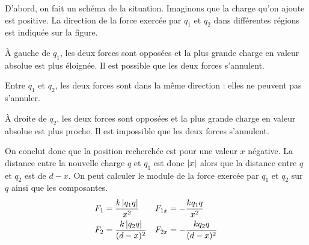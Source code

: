 \begin{reponsebox}
D'abord, on fait un schéma de la situation. Imaginons que la charge qu'on
ajoute est positive. La direction de la force exercée par $q_1$ et $q_2$ dans
différentes régions est indiquée sur la figure.

\begin{center}
\end{center}

À gauche de $q_1$, les deux forces sont opposées et la plus grande charge en
valeur absolue est plus éloignée. Il est possible que les deux forces
s'annulent.

Entre $q_1$ et $q_2$, les deux forces sont dans la même direction : elles ne
peuvent pas s'annuler.

À droite de $q_2$, les deux forces sont opposées et la plus grande charge en
valeur absolue est plus proche. Il est impossible que les deux forces
s'annulent.

On conclut donc que la position recherchée est pour une valeur $x$ négative. La
distance entre la nouvelle charge $q$ et $q_1$ est donc $\left| x \right|$ alors que la
distance entre $q$ et $q_2$ est de $d - x$. On peut calculer le module de la
force exercée par $q_1$ et $q_2$ sur $q$ ainsi que les composantes.
\begin{align*}
  F_1 &= \frac{k\left| q_1q \right|}{x^2}        &  F_{1x} &= -\frac{kq_1q}{x^2} \\
  F_2 &= \frac{k\left| q_2q \right|}{(d - x)^2}  &  F_{2x} &= -\frac{kq_2q}{(d - x)^2}
\end{align*}


\end{reponsebox}

